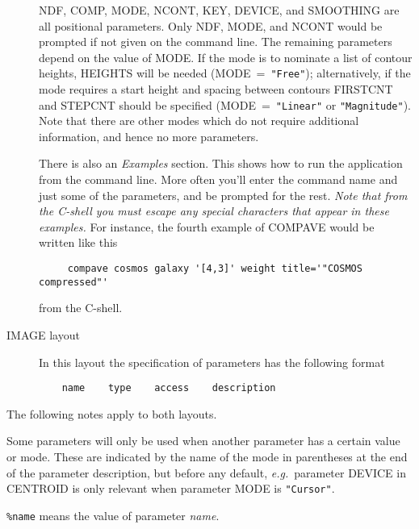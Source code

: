 \documentclass[twoside,11pt]{article}
\newcommand{\htmlref}[2]{#1}
\begin{document}
\begin{description}
NDF, COMP, MODE, NCONT, KEY, DEVICE, and SMOOTHING are all positional
parameters.  Only NDF, MODE, and NCONT would be prompted if not given
on the command line.  The remaining parameters depend on the value of
MODE.  If the mode is to nominate a list of contour heights, HEIGHTS
will be needed (MODE~=~{\tt "Free"}); alternatively, if the mode requires a
start height and spacing between contours FIRSTCNT and STEPCNT should be
specified (MODE~=~{\tt "Linear"} or {\tt "Magnitude"}).  Note that there
are other modes which do not require additional information, and hence no
more parameters. 

There is also an {\em Examples\/} section. \label{ap:example}  This
shows how to run the application from the command line.  More often
you'll enter the command name and just some of the parameters, and be
prompted for the rest. {\em Note that from the C-shell you must escape
any special characters that appear in these examples.} For instance,
the fourth example of COMPAVE would be written like this

\begin{verbatim}
     compave cosmos galaxy '[4,3]' weight title='"COSMOS compressed"'
\end{verbatim}

from the C-shell.

\item [IMAGE layout]
In this layout the specification of parameters has the following format
\begin{verbatim}
    name    type    access    description
\end{verbatim}
\end{description}
\medskip

The following notes apply to both layouts.

Some parameters will only be used when another parameter has a certain
value or mode. These are indicated by the name of the mode in
parentheses at the end of the parameter description, but before any
default, {\it{e.g.}}\ parameter DEVICE in \htmlref{CENTROID}{CENTROID}
is only relevant when parameter MODE is {\tt "Cursor"}.

{\tt \%name} means the value of parameter {\it name}.
\end{document}
